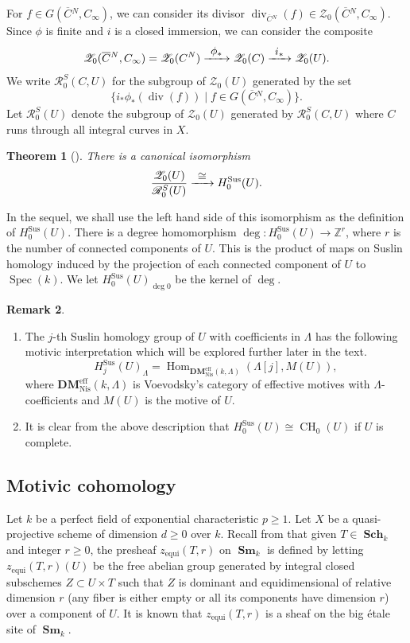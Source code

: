 \documentclass[JEP,XML,SOM,Unicode,published]{cedram}
\let\mathcal\mathscr
\let\sep\mid
\def\To#1{\mathchoice{\xrightarrow{\textstyle\kern4pt#1\kern3pt}}{\stackrel{#1}{\longrightarrow}}{}{}}
\newcommand{\equi}{\mathrm{equi}}
\newcommand{\sus}{\mathrm{Sus}}
\newtheorem{thm}{Theorem}[section]
\theoremstyle{definition}
\newtheorem{remk}[thm]{Remark}
\newcommand{\sR}{{\mathcal R}}
\newcommand{\sZ}{{\mathcal Z}}
\newcommand{\Z}{{\mathbb Z}}
\DeclareMathOperator{\CH}{CH}
\DeclareMathOperator{\divf}{div}
\DeclareMathOperator{\Hom}{Hom}
\DeclareMathOperator{\Sch}{\mathbf{Sch}}
\DeclareMathOperator{\Sm}{\mathbf{Sm}}
\DeclareMathOperator{\Spec}{Spec}
\newcommand{\eff}{\mathrm{eff}}
\newcommand{\Nis}{\mathrm{Nis}}
\let\ov\overline
\let\ol\ov
\begin{document}
For $f\in G(\ol{C}{}^N, C_\infty)$, we can consider its divisor $\divf_{\ol{C}{}^N}(f)\in \sZ_0(\ol{C}{}^N, C_\infty)$. Since $\phi$ is finite and $i$ is a closed immersion, we can consider the composite\vspace*{-3pt}
\[ \sZ_0(\ol{C}{}^N, C_\infty) = \sZ_0(C^N) \To{\phi_*} \sZ_0(C) \To{i_*} \sZ_0(U). \]
We write $\sR^{S}_0(C, U)$ for the subgroup of $\sZ_0(U)$ generated by the set
\[
\{ i_*\phi_* (\divf(f)) \sep f\in G(\ol{C}{}^N, C_\infty)\}.
\]
Let $\sR^S_0(U)$ denote the subgroup of $\sZ_0(U)$ generated by $\sR^{S}_0(C, U)$ where $C$ runs through all integral curves in $X$.

\begin{thm}[{\cite[Th.\,5.1]{Schmidt-1}}]\label{thm:suslinhomology}
There is a canonical isomorphism
\[
\frac{\sZ_0(U)}{\sR_0^S(U)} \To{\cong} H^{\sus}_0(U).
\]
\end{thm}

In the sequel, we shall use the left hand side of this isomorphism as the
definition of $H^{\sus}_0(U)$. There is a
degree homomorphism $\deg \colon H^{\sus}_0(U) \to \Z^r$, where
$r$ is the number of connected components of $U$. This is the product of
maps on Suslin homology induced by the projection of each connected
component of $U$ to $\Spec(k)$. We let
$H^{\sus}_0(U)_{\deg 0}$ be the kernel of $\deg$.

\skpt
\begin{remk}\label{remk:mot-homology-DM}
\begin{enumerate}
\item
The $j$-th Suslin homology group of $U$ with coefficients in $\Lambda$
has the following motivic interpretation which will be explored further later in the
text.
\[ H_j^{\sus}(U)_{\Lambda} = \Hom_{\mathbf{DM}^{\eff}_{\Nis}(k, \Lambda)}(\Lambda[j], M(U)),
\]
where $\mathbf{DM}^{\eff}_{\Nis}(k, \Lambda)$ is Voevodsky's category of effective
motives with $\Lambda$-coefficients and $M(U)$ is the motive
of $U$.

\item
It is clear from the above description that
$H_0^{\sus}(U) \cong \CH_0(U)$ if $U$ is complete.
\end{enumerate}
\end{remk}

\subsection{Motivic cohomology}
\label{sec:LW-mot-coh}Let $k$ be a perfect
field of exponential characteristic $p \ge 1$.
Let $X$ be a quasi-projective scheme of dimension $d \ge 0$ over $k$.
Recall from \cite[Lect.\,16]{MVW} that given $T \in \Sch_k$ and integer
$r \ge 0$, the presheaf $z_{\equi}(T,r)$ on $\Sm_k$ is defined by
letting $z_{\equi}(T,r)(U)$ be the free abelian group generated by
integral closed subschemes $Z \subset U \times T$ such that $Z$ is dominant and
equidimensional of relative dimension $r$ (any fiber is either empty or all
its components have dimension $r$) over a component of $U$.
It is known that $z_{\equi}(T,r)$ is a sheaf on the big étale site of $\Sm_k$.
\end{document}
